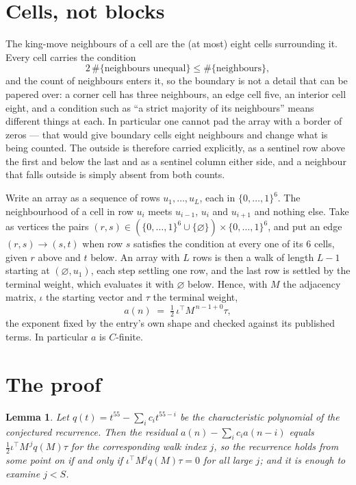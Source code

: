 \documentclass[11pt,a4paper]{article}
\theoremstyle{plain}
\newtheorem{lemma}[theorem]{Lemma}
\theoremstyle{definition}
\begin{document}
\section{Cells, not blocks}

The king-move neighbours of a cell are the (at most) eight cells surrounding it. Every cell
carries the condition
\[
2\,\#\{\text{neighbours unequal}\}\le\#\{\text{neighbours}\},
\]
and the count of neighbours enters it, so the boundary is not a detail that can be papered
over: a corner cell has three neighbours, an edge cell five, an interior cell eight, and a
condition such as ``a strict majority of its neighbours'' means different things at each. In
particular one cannot pad the array with a border of zeros --- that would give boundary cells
eight neighbours and change what is being counted. The outside is therefore carried
explicitly, as a sentinel row above the first and below the last and as a sentinel column
either side, and a neighbour that falls outside is simply absent from both counts.

Write an array as a sequence of rows $u_1,\dots,u_L$, each in
$\{0,\dots,1\}^{6}$. The neighbourhood of a cell in row $u_i$ meets $u_{i-1}$,
$u_i$ and $u_{i+1}$ and nothing else. Take as vertices the pairs
$(r,s)\in(\{0,\dots,1\}^{6}\cup\{\varnothing\})\times\{0,\dots,1\}^{6}$,
and put an edge $(r,s)\to(s,t)$ when row $s$ satisfies the condition at every one of its
$6$ cells, given $r$ above and $t$ below. An array with $L$ rows is then a walk of length
$L-1$ starting at $(\varnothing,u_1)$, each step settling one row, and the last row is
settled by the terminal weight, which evaluates it with $\varnothing$ below. Hence,
with $M$ the adjacency matrix, $\iota$ the starting vector and $\tau$ the terminal weight,
\[
a(n)\;=\;\tfrac1{2}\,\iota^{\!\top}M^{\,n-1+0}\tau ,
\]
the exponent fixed by the entry's own shape and checked against its published terms. In
particular $a$ is $C$-finite.

\section{The proof}

\begin{lemma}\label{lem:crit}
Let $q(t)=t^{55}-\sum_i c_it^{55-i}$ be the characteristic polynomial of the
conjectured recurrence. Then the residual $a(n)-\sum_ic_ia(n-i)$ equals
$\tfrac1{2}\iota^{\!\top}M^{\,j}q(M)\tau$ for the corresponding walk index $j$, so the
recurrence holds from some point on if and only if $\iota^{\!\top}M^{j}q(M)\tau=0$ for all
large $j$; and it is enough to examine $j<S$.
\end{lemma}
\end{document}
